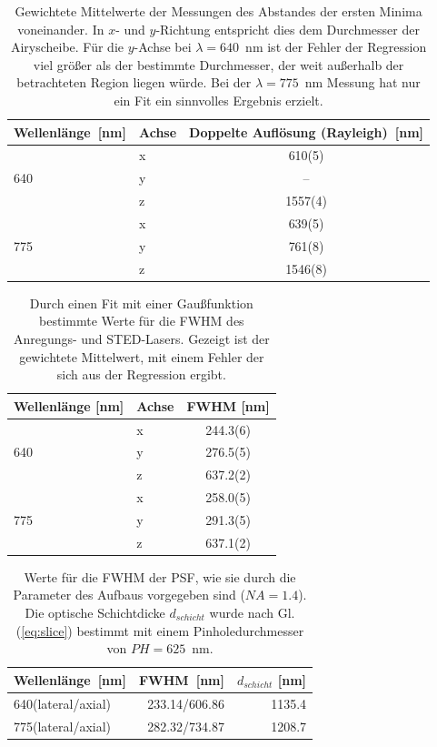 \begin{table}
	\centering
	\caption{
		Gewichtete Mittelwerte der Messungen des Abstandes der ersten Minima voneinander. In $x$- und $y$-Richtung entspricht dies dem Durchmesser der Airyscheibe.
Für die $y$-Achse bei $\lambda = 640$~nm ist der Fehler der Regression viel größer als der bestimmte Durchmesser, der weit außerhalb der betrachteten Region liegen würde.
Bei der $\lambda = 775$~nm Messung hat nur ein Fit ein sinnvolles Ergebnis erzielt.}
	\begin{tabular}{l|l|c}
		Wellenlänge~[nm] & Achse & Doppelte Auflösung (Rayleigh)~[nm] \\ \hline 
		    &x&610(5)\\
		 640&y&--\\ 
		    &z&1557(4)\\ \hline
		    &x&639(5)\\
		 775&y&761(8)\\
		    &z&1546(8)\\
	\end{tabular}\label{tab:psffits}
\end{table}
\begin{table}
\centering
\caption{Durch einen Fit mit einer Gaußfunktion bestimmte Werte für die FWHM des Anregungs- und STED-Lasers. Gezeigt ist der gewichtete Mittelwert, mit einem Fehler der sich aus der Regression ergibt.}\label{tab:psffwhm}
\begin{tabular}{l|l|c}
	Wellenlänge [nm]& Achse & FWHM [nm] \\ \hline
	   &x&244.3(6)\\
	640&y&276.5(5)\\
	   &z&637.2(2)\\ \hline
	   &x&258.0(5)\\
	775&y&291.3(5)\\
	   &z&637.1(2)\\
\end{tabular}
\end{table}
\begin{table}
	\centering
	\caption{Werte für die FWHM der PSF, wie sie durch die Parameter des Aufbaus vorgegeben sind ($NA=1.4$). Die optische Schichtdicke $d_{schicht}$ wurde nach Gl. (\ref{eq:slice}) bestimmt mit einem Pinholedurchmesser von $PH = 625$~nm.}\label{tab:fwhmaufbau}
	\begin{tabular}{l|rr}
		Wellenlänge~[nm] & FWHM~[nm] & $d_{schicht}$ [nm]\\ \hline
		640(lateral/axial) & 233.14/606.86 & 1135.4\\
		775(lateral/axial) & 282.32/734.87 & 1208.7
	\end{tabular}
\end{table}


